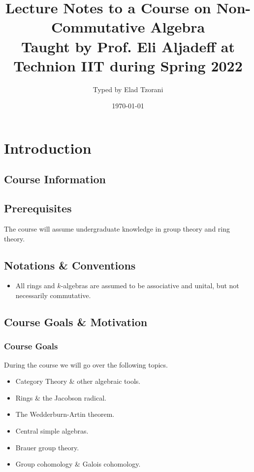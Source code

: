 \documentclass[11pt]{kbook}
\title{Lecture Notes to a Course on Non-Commutative Algebra \\ \small{Taught by Prof. Eli Aljadeff at Technion IIT during Spring 2022}}
\author{Typed by Elad Tzorani}
\date{\today}
\begin{document}
\maketitle


\chapter{Introduction}

\section*{Course Information}


\section*{Prerequisites}

The course will assume undergraduate knowledge in group theory and ring theory.

\section*{Notations \& Conventions}


\begin{itemize}
\item All rings and $k$-algebras are assumed to be associative and unital, but not necessarily commutative.
\end{itemize}

\section*{Course Goals \& Motivation}

\subsection*{Course Goals}

During the course we will go over the following topics.

\begin{itemize}
\item Category Theory \& other algebraic tools.

\item Rings \& the Jacobson radical.

\item The Wedderburn-Artin theorem.

\item Central simple algebras.

\item Brauer group theory.

\item Group cohomology \& Galois cohomology.

\end{itemize}
\end{document}
